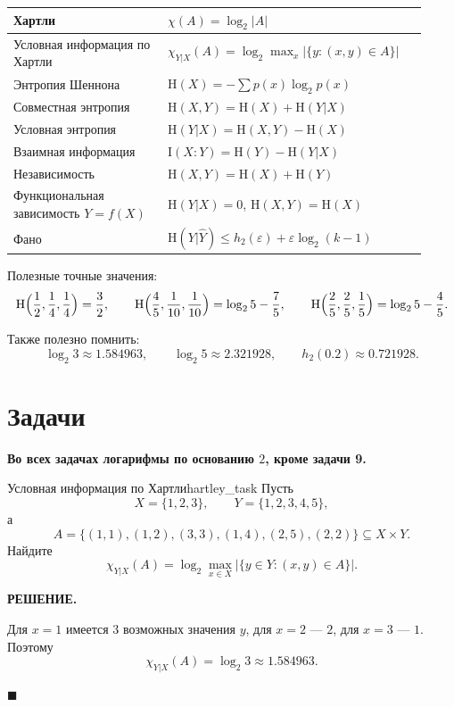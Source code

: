 \documentclass[12pt,a4paper]{article}
\renewcommand{\le}{\leqslant}
\newcommand{\HH}{\mathrm{H}}
\newcommand{\II}{\mathrm{I}}
\newcommand{\ChiH}{\chi}
\newenvironment{solution}{
    \begin{tcolorbox}[
        enhanced, breakable, blanker,
        borderline west={2.5pt}{0pt}{solgray},
        left=12pt, top=5pt, bottom=5pt,
        before skip=10pt, after skip=15pt
    ]
    \textbf{\textsf{РЕШЕНИЕ.}}\;
}{
    \hfill $\blacksquare$
    \end{tcolorbox}
}
\begin{document}
\begin{center}
\begin{tabular}{|>{\raggedright\arraybackslash}p{0.35\linewidth}|>{\raggedright\arraybackslash}p{0.57\linewidth}|}
\hline
Хартли & $\ChiH(A)=\log_2|A|$ \\ \hline
Условная информация по Хартли & $\ChiH_{Y|X}(A)=\log_2 \max_{x} |\{y:(x,y)\in A\}|$ \\ \hline
Энтропия Шеннона & $\HH(X)=-\sum p(x)\log_2 p(x)$ \\ \hline
Совместная энтропия & $\HH(X,Y)=\HH(X)+\HH(Y|X)$ \\ \hline
Условная энтропия & $\HH(Y|X)=\HH(X,Y)-\HH(X)$ \\ \hline
Взаимная информация & $\II(X:Y)=\HH(Y)-\HH(Y|X)$ \\ \hline
Независимость & $\HH(X,Y)=\HH(X)+\HH(Y)$ \\ \hline
Функциональная зависимость $Y=f(X)$ & $\HH(Y|X)=0$, $\HH(X,Y)=\HH(X)$ \\ \hline
Фано & $\HH(Y|\widehat Y)\le h_2(\varepsilon)+\varepsilon\log_2(k-1)$ \\ \hline
\end{tabular}
\end{center}

Полезные точные значения:
$$
\HH\Bigl(\frac12,\frac14,\frac14\Bigr)=\frac32,
\qquad
\HH\Bigl(\frac45,\frac1{10},\frac1{10}\Bigr)=\log_2 5-\frac75,
\qquad
\HH\Bigl(\frac25,\frac25,\frac15\Bigr)=\log_2 5-\frac45.
$$

Также полезно помнить:
$$
\log_2 3\approx 1.584963,
\qquad
\log_2 5\approx 2.321928,
\qquad
h_2(0.2)\approx 0.721928.
$$

\newpage
\section{Задачи}

\textbf{Во всех задачах логарифмы по основанию $2$, кроме задачи 9.}

\begin{problem}{Условная информация по Хартли}{hartley_task}
Пусть
$$
X=\{1,2,3\},\qquad Y=\{1,2,3,4,5\},
$$
а
$$
A=\{(1,1),(1,2),(3,3),(1,4),(2,5),(2,2)\}\subseteq X\times Y.
$$
Найдите
$$
\ChiH_{Y|X}(A)=\log_2 \max_{x\in X} |\{y\in Y:(x,y)\in A\}|.
$$
\end{problem}
\begin{solution}
Для $x=1$ имеется $3$ возможных значения $y$, для $x=2$ --- $2$, для $x=3$ --- $1$. Поэтому
$$
\ChiH_{Y|X}(A)=\log_2 3\approx 1.584963.
$$
\end{solution}
\end{document}
